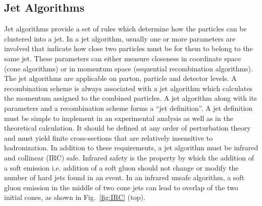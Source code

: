 \subsection{Jet Algorithms}
\label{sec:jet_algos}
Jet algorithms \cite{Salam:2009jx} provide a set of rules which determine how the particles can be clustered into a jet. In a jet algorithm, usually one or more parameters are involved that indicate how close two particles must be for them to belong to the same jet. These parameters can either measure closeness in coordinate space (cone algorithms) or in momentum space (sequential recombination algorithms). The jet algorithms are applicable on parton, particle and detector levels. A recombination scheme is always associated with a jet algorithm which calculates the momentum assigned to the combined particles. A jet algorithm along with its parameters and a recombination scheme forms a ``jet definition''. A jet definition \cite{Ellis:1989vm} must be simple to implement in an experimental analysis as well as in the theoretical calculation. It should be defined at any order of perturbation theory and must yield finite cross-sections that are relatively insensitive to hadronization. In addition to these requirements, a jet algorithm must be infrared and collinear (IRC) safe. Infrared safety is the property by which the addition of a soft emission i.e. addition of a soft gluon should not change or modify the number of hard jets found in an event. In an infrared unsafe algorithm, a soft gluon emission in the middle of two cone jets can lead to overlap of the two initial cones, as shown in Fig.~\ref{fig:IRC} (top). 
